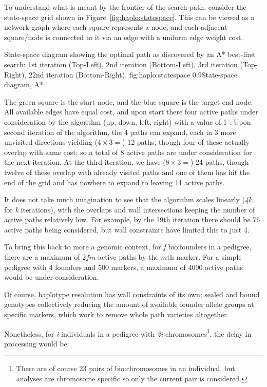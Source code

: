 To understand what is meant by the frontier of the search path, consider the state-space grid shown in Figure~\ref{fig:haplo:statespace}. This can be viewed as a network graph where each square represents a node, and each adjacent square/node is connected to it via an edge with a uniform edge weight cost.

	{State-space diagram showing the optimal path as discovered by an A* best-first search: 1st iteration (Top-Left), 2nd iteration (Bottom-Left), 3rd iteration (Top-Right), 22nd iteration (Bottom-Right).}
	{fig:haplo:statespace}
	{0.9}{State-space diagram, A*}
	
The green square is the start node, and the blue square is the target end node. All available edges have equal cost, and upon start there four active paths under consideration by the algorithm (up, down, left, right) with a value of 1 . Upon second iteration of the algorithm, the 4 paths can expand, each in 3 more unvisited directions yielding ($4 \times 3 = $) 12 paths, though four of these actually overlap with same cost; so a total of 8 active paths are under consideration for the next iteration. At the third iteration, we have ($8 \times 3 = $) 24 paths, though twelve of these overlap with already visited paths and one of them  has hit the end of the grid and has nowhere to expand to leaving 11 active paths.

It does not take much imagination to see that the algorithm scales linearly (\textit{4k}, for \textit{k} iterations), with the overlaps and wall intersections keeping the number of active paths relatively low. For example, by the 19th iteration there should be 76 active paths being considered, but wall constraints  have limited this to just 4.

To bring this back to more a genomic context, for \textit{f} \gls{bio:founders} in a pedigree, there are a maximum of $2fm$ active paths by the $m$th marker. For a simple pedigree with 4 founders and 500 markers, a maximum of 4000 active paths would be under consideration.

Of course, haplotype resolution has wall constraints of its own; sealed and bound genotypes  collectively reducing the amount of available founder allele groups at specific markers, which work to remove whole path varieties altogether.

Nonetheless, for \textit{i} individuals in a pedigree with \textit{2i} chromosomes\footnote{There are of course 23 pairs of \gls{bio:chromosomes} in an individual, but analyses are chromosome specific so only the current pair is considered.}, the delay in processing would be:

